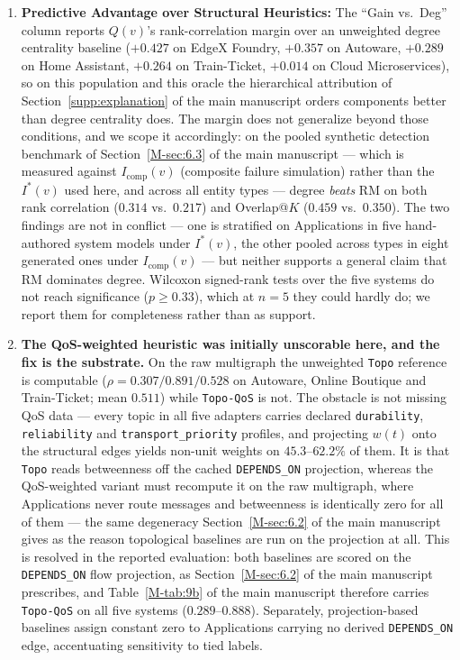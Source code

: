 \documentclass[preprint,3p]{elsarticle}
\begin{document}
\begin{enumerate}
    \item \textbf{Predictive Advantage over Structural Heuristics:} The ``Gain vs.\ Deg'' column reports $Q(v)$'s rank-correlation margin over an unweighted degree centrality baseline ($+0.427$ on EdgeX Foundry, $+0.357$ on Autoware, $+0.289$ on Home Assistant, $+0.264$ on Train-Ticket, $+0.014$ on Cloud Microservices), so on this population and this oracle the hierarchical attribution of Section~\ref{supp:explanation} of the main manuscript orders components better than degree centrality does. The margin does not generalize beyond those conditions, and we scope it accordingly: on the pooled synthetic detection benchmark of Section~\ref{M-sec:6.3} of the main manuscript --- which is measured against $I_{\text{comp}}(v)$ (composite failure simulation) rather than the $I^*(v)$ used here, and across all entity types --- degree \emph{beats} RM on both rank correlation ($0.314$ vs.\ $0.217$) and Overlap@$K$ ($0.459$ vs.\ $0.350$). The two findings are not in conflict --- one is stratified on Applications in five hand-authored system models under $I^*(v)$, the other pooled across types in eight generated ones under $I_{\text{comp}}(v)$ --- but neither supports a general claim that RM dominates degree. Wilcoxon signed-rank tests over the five systems do not reach significance ($p \ge 0.33$), which at $n = 5$ they could hardly do; we report them for completeness rather than as support.

    \item \textbf{The QoS-weighted heuristic was initially unscorable here, and the fix is the substrate.} On the raw multigraph the unweighted \texttt{Topo} reference is computable ($\rho = 0.307 / 0.891 / 0.528$ on Autoware, Online Boutique and Train-Ticket; mean $0.511$) while \texttt{Topo-QoS} is not. The obstacle is not missing QoS data --- every topic in all five adapters carries declared \texttt{durability}, \texttt{reliability} and \texttt{transport\_priority} profiles, and projecting $w(t)$ onto the structural edges yields non-unit weights on $45.3$--$62.2\%$ of them. It is that \texttt{Topo} reads betweenness off the cached \texttt{DEPENDS\_ON} projection, whereas the QoS-weighted variant must recompute it on the raw multigraph, where Applications never route messages and betweenness is identically zero for all of them --- the same degeneracy Section~\ref{M-sec:6.2} of the main manuscript gives as the reason topological baselines are run on the projection at all. This is resolved in the reported evaluation: both baselines are scored on the \texttt{DEPENDS\_ON} flow projection, as Section~\ref{M-sec:6.2} of the main manuscript prescribes, and Table~\ref{M-tab:9b} of the main manuscript therefore carries \texttt{Topo-QoS} on all five systems ($0.289$--$0.888$). Separately, projection-based baselines assign constant zero to Applications carrying no derived \texttt{DEPENDS\_ON} edge, accentuating sensitivity to tied labels.
\end{enumerate}
\end{document}
